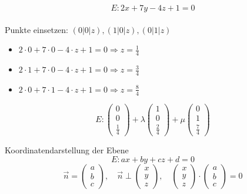 \begin{example}
    $$E: 2x + 7y - 4z + 1 = 0$$\\
    Punkte einsetzen: $(0|0|z), (1|0|z), (0|1|z)$\\
    \begin{minipage}{0.5\linewidth}
    \begin{itemize}
        \item $2 \cdot 0 + 7 \cdot 0 - 4 \cdot z + 1 = 0 \Rightarrow z = \frac{1}{4}$
        \item $2 \cdot 1 + 7 \cdot 0 - 4 \cdot z + 1 = 0 \Rightarrow z = \frac{3}{4}$
        \item $2 \cdot 0 + 7 \cdot 1 - 4 \cdot z + 1 = 0 \Rightarrow z = \frac{8}{4}$
    \end{itemize}
    \end{minipage}
    \begin{minipage}{0.5\linewidth}
    $$E: \begin{pmatrix} 0 \\ 0 \\ \frac{1}{4} \end{pmatrix} +
    \lambda \begin{pmatrix} 1 \\ 0 \\ \frac{2}{4} \end{pmatrix} +
    \mu \begin{pmatrix} 0 \\ 1 \\ \frac{7}{4} \end{pmatrix}$$
    \end{minipage}
\end{example}

\begin{concept}{Koordinatendarstellung} der Ebene
    $$E: ax + by + cz + d = 0$$
    $$\vec{n} = \begin{pmatrix} a \\ b \\ c \end{pmatrix}, \quad
    \vec{n} \perp \begin{pmatrix} x \\ y \\ z \end{pmatrix}, \quad
    \begin{pmatrix} x \\ y \\ z \end{pmatrix} \cdot \begin{pmatrix} a \\ b \\ c \end{pmatrix} = 0$$
\end{concept}

